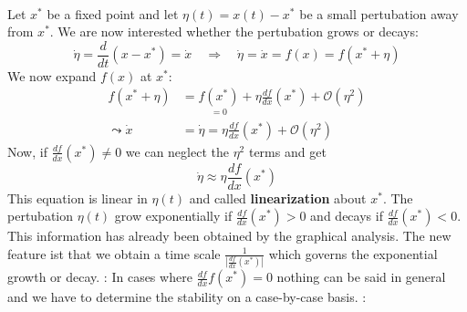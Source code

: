 \noindent\textbf{\underline{}}\\\vspace{0.2 cm}
Let $x^\ast$ be a fixed point and let $\eta(t)=x(t)-x^\ast$ be a small pertubation away from $x^\ast$. We are now interested whether the pertubation grows or decays:
\begin{equation*}
	\dot{\eta}=\frac{d}{dt}\left(x-x^\ast\right)=\dot{x} \quad \Rightarrow\quad \dot{\eta}=\dot{x}=f(x)=f(x^\ast+\eta)
\end{equation*}
We now expand $f(x)$ at $x^\ast$:
\begin{align*}
	f(x^\ast+\eta)&=\underset{=0}{f(x^\ast)}+\eta\frac{df}{dx}(x^\ast)+\mathcal{O}(\eta^2)\\
	\leadsto \dot{x}&=\dot{\eta}=\eta\frac{df}{dx}(x^\ast)+\mathcal{O}(\eta^2)
\end{align*}
Now, if $\frac{df}{dx}(x^\ast)\neq 0$ we can neglect the $\mathcal{\eta^2}$ terms and get
\begin{equation*}
	\dot{\eta}\approx\eta\frac{df}{dx}(x^\ast)
\end{equation*}
This equation is linear in $\eta(t)$ and called \textbf{linearization} about $x^\ast$. The pertubation $\eta(t)$ grow exponentially if $\frac{df}{dx}(x^\ast)>0$ and decays if $\frac{df}{dx}(x^\ast)<0$. This information has already been obtained by the graphical analysis. The new feature ist that we obtain a time scale $\frac{1}{\left|\frac{df}{dx}(x^\ast)\right|}$ which governs the exponential growth or decay.
\underline{}: In cases where $\frac{df}{dx}f(x^\ast)=0$ nothing can be said in general and we have to determine the stability on a case-by-case basis.
\underline{}:\\\vspace{0.1 cm}
\begin{figure}[H]
	\\
\end{figure}
